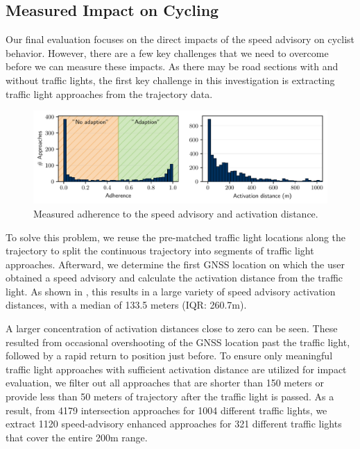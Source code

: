 \subsection{Measured Impact on Cycling}

Our final evaluation focuses on the direct impacts of the speed advisory on cyclist behavior. However, there are a few key challenges that we need to overcome before we can measure these impacts. As there may be road sections with and without traffic lights, the first key challenge in this investigation is extracting traffic light approaches from the trajectory data. 

\begin{figure}[t]
\caption{Measured adherence to the speed advisory and activation distance.}\label{fig:impacts-adherence-activation-distance}
\includegraphics[width=\linewidth]{images/impacts-adherence-activation-distance.pdf}
\end{figure}

To solve this problem, we reuse the pre-matched traffic light locations along the trajectory to split the continuous trajectory into segments of traffic light approaches. Afterward, we determine the first GNSS location on which the user obtained a speed advisory and calculate the activation distance from the traffic light. As shown in , this results in a large variety of speed advisory activation distances, with a median of 133.5 meters (IQR: 260.7m). 

A larger concentration of activation distances close to zero can be seen. These resulted from occasional overshooting of the GNSS location past the traffic light, followed by a rapid return to position just before. To ensure only meaningful traffic light approaches with sufficient activation distance are utilized for impact evaluation, we filter out all approaches that are shorter than 150 meters or provide less than 50 meters of trajectory after the traffic light is passed. As a result, from 4179 intersection approaches for 1004 different traffic lights, we extract 1120 speed-advisory enhanced approaches for 321 different traffic lights that cover the entire 200m range.

